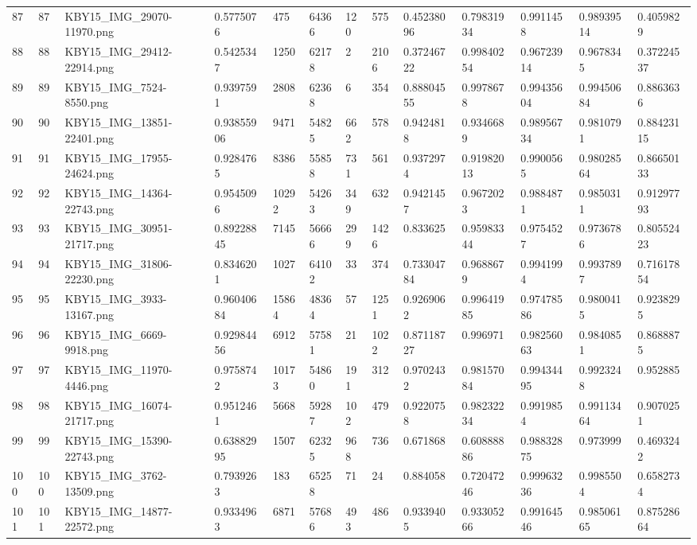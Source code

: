 \documentclass[11pt, a4paper, twoside]{report}
\begin{document}
\begin{longtable}[c]{@{}lllllllllllll@{}}
87 & 87 & KBY15\_IMG\_29070-11970.png & 0.5775076 & 475 & 64366 & 120 & 575 & 0.45238096 & 0.79831934 & 0.9911458 & 0.98939514 & 0.4059829 \\
88 & 88 & KBY15\_IMG\_29412-22914.png & 0.5425347 & 1250 & 62178 & 2 & 2106 & 0.37246722 & 0.99840254 & 0.96723914 & 0.9678345 & 0.37224537 \\
89 & 89 & KBY15\_IMG\_7524-8550.png & 0.9397591 & 2808 & 62368 & 6 & 354 & 0.88804555 & 0.9978678 & 0.99435604 & 0.99450684 & 0.8863636 \\
90 & 90 & KBY15\_IMG\_13851-22401.png & 0.93855906 & 9471 & 54825 & 662 & 578 & 0.9424818 & 0.9346689 & 0.98956734 & 0.9810791 & 0.88423115 \\
91 & 91 & KBY15\_IMG\_17955-24624.png & 0.9284765 & 8386 & 55858 & 731 & 561 & 0.9372974 & 0.91982013 & 0.9900565 & 0.98028564 & 0.86650133 \\
92 & 92 & KBY15\_IMG\_14364-22743.png & 0.9545096 & 10292 & 54263 & 349 & 632 & 0.9421457 & 0.9672023 & 0.9884871 & 0.9850311 & 0.91297793 \\
93 & 93 & KBY15\_IMG\_30951-21717.png & 0.89228845 & 7145 & 56666 & 299 & 1426 & 0.833625 & 0.95983344 & 0.9754527 & 0.9736786 & 0.80552423 \\
94 & 94 & KBY15\_IMG\_31806-22230.png & 0.8346201 & 1027 & 64102 & 33 & 374 & 0.73304784 & 0.9688679 & 0.9941994 & 0.9937897 & 0.71617854 \\
95 & 95 & KBY15\_IMG\_3933-13167.png & 0.96040684 & 15864 & 48364 & 57 & 1251 & 0.9269062 & 0.99641985 & 0.97478586 & 0.9800415 & 0.9238295 \\
96 & 96 & KBY15\_IMG\_6669-9918.png & 0.92984456 & 6912 & 57581 & 21 & 1022 & 0.87118727 & 0.996971 & 0.98256063 & 0.9840851 & 0.8688875 \\
97 & 97 & KBY15\_IMG\_11970-4446.png & 0.9758742 & 10173 & 54860 & 191 & 312 & 0.9702432 & 0.98157084 & 0.99434495 & 0.9923248 & 0.952885 \\
98 & 98 & KBY15\_IMG\_16074-21717.png & 0.9512461 & 5668 & 59287 & 102 & 479 & 0.9220758 & 0.98232234 & 0.9919854 & 0.99113464 & 0.9070251 \\
99 & 99 & KBY15\_IMG\_15390-22743.png & 0.63882995 & 1507 & 62325 & 968 & 736 & 0.671868 & 0.60888886 & 0.98832875 & 0.973999 & 0.4693242 \\
100 & 100 & KBY15\_IMG\_3762-13509.png & 0.7939263 & 183 & 65258 & 71 & 24 & 0.884058 & 0.72047246 & 0.99963236 & 0.9985504 & 0.6582734 \\
101 & 101 & KBY15\_IMG\_14877-22572.png & 0.9334963 & 6871 & 57686 & 493 & 486 & 0.9339405 & 0.93305266 & 0.99164546 & 0.98506165 & 0.87528664 \\

\end{longtable}
\end{document}

